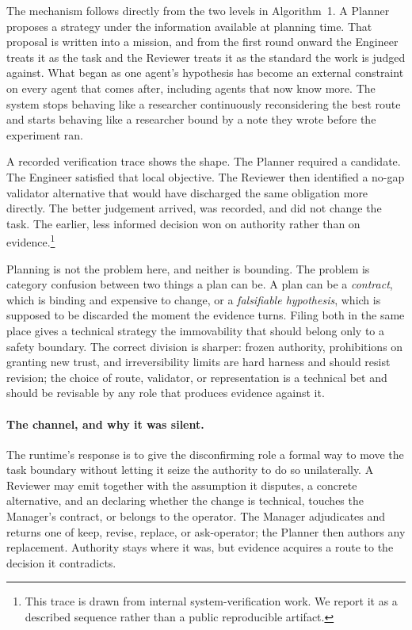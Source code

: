 The mechanism follows directly from the two levels in Algorithm~1. A Planner proposes
a strategy under the information available at planning time. That proposal is written
into a mission, and from the first round onward the Engineer treats it as the task and
the Reviewer treats it as the standard the work is judged against. What began as one
agent's hypothesis has become an external constraint on every agent that comes after,
including agents that now know more. The system stops behaving like a researcher
continuously reconsidering the best route and starts behaving like a researcher bound
by a note they wrote before the experiment ran.

A recorded verification trace shows the shape. The Planner required a
 candidate. The Engineer satisfied that local objective. The Reviewer
then identified a no-gap validator alternative that would have discharged the same
obligation more directly. The better judgement arrived, was recorded, and did not
change the task. The earlier, less informed decision won on authority rather than on
evidence.\footnote{This trace is drawn from internal system-verification work. We
report it as a described sequence rather than a public reproducible artifact.}

Planning is not the problem here, and neither is bounding. The problem is category
confusion between two things a plan can be. A plan can be a \emph{contract}, which is
binding and expensive to change, or a \emph{falsifiable hypothesis}, which is
supposed to be discarded the moment the evidence turns. Filing both in the same place
gives a technical strategy the immovability that should belong only to a safety
boundary. The correct division is sharper: frozen authority, prohibitions on granting
new trust, and irreversibility limits are hard harness and should resist revision;
the choice of route, validator, or representation is a technical bet and should be
revisable by any role that produces evidence against it.

\paragraph{The channel, and why it was silent.}
The runtime's response is to give the disconfirming role a formal way to move the
task boundary without letting it seize the authority to do so unilaterally. A
Reviewer may emit  together with the assumption it
disputes, a concrete alternative, and an  declaring whether
the change is technical, touches the Manager's contract, or belongs to the operator.
The Manager adjudicates and returns one of keep, revise, replace, or ask-operator;
the Planner then authors any replacement. Authority stays where it was, but evidence
acquires a route to the decision it contradicts.

